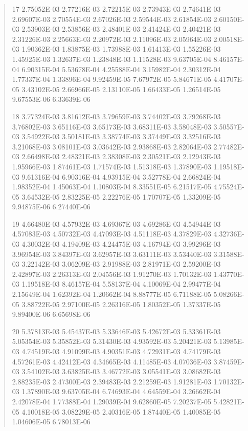 \documentclass[letterpaper,10pt,english]{sphinxmanual}
\begin{document}
\begin{quote}
\begin{DUlineblock}{0em}
\item[] 17   2.75052E-03  2.77216E-03  2.72215E-03  2.73943E-03  2.74641E-03  2.69607E-03  2.70554E-03  2.67026E-03  2.59544E-03  2.61854E-03  2.60150E-03  2.53903E-03  2.53856E-03  2.48401E-03  2.41424E-03  2.40421E-03  2.31226E-03  2.25663E-03  2.20972E-03  2.11096E-03  2.05964E-03  2.00518E-03  1.90362E-03  1.83875E-03  1.73988E-03  1.61413E-03  1.55226E-03  1.45925E-03  1.32637E-03  1.23848E-03  1.11528E-03  9.63705E-04  8.46157E-04  6.90315E-04  5.53678E-04  4.25588E-04  3.15982E-04  2.30312E-04  1.77337E-04  1.33896E-04  9.92459E-05  7.67972E-05  5.84671E-05  4.41707E-05  3.43102E-05  2.66966E-05  2.13110E-05  1.66433E-05  1.26514E-05  9.67553E-06  6.33639E-06
\item[] 18   3.77324E-03  3.81612E-03  3.79659E-03  3.74402E-03  3.79268E-03  3.76802E-03  3.65116E-03  3.65173E-03  3.68311E-03  3.58048E-03  3.50557E-03  3.54922E-03  3.50181E-03  3.38774E-03  3.37449E-03  3.32516E-03  3.21068E-03  3.08101E-03  3.03642E-03  2.93868E-03  2.82064E-03  2.77482E-03  2.66498E-03  2.48321E-03  2.38308E-03  2.30521E-03  2.12943E-03  1.95966E-03  1.87461E-03  1.71574E-03  1.51318E-03  1.37890E-03  1.19518E-03  9.61316E-04  6.90316E-04  4.93915E-04  3.52778E-04  2.66824E-04  1.98352E-04  1.45063E-04  1.10803E-04  8.33551E-05  6.21517E-05  4.75524E-05  3.64532E-05  2.83225E-05  2.22276E-05  1.70707E-05  1.33209E-05  9.94875E-06  6.27440E-06
\item[] 19   4.66480E-03  4.57932E-03  4.69367E-03  4.69286E-03  4.54944E-03  4.57083E-03  4.50732E-03  4.47093E-03  4.51118E-03  4.37829E-03  4.32736E-03  4.30032E-03  4.19409E-03  4.24475E-03  4.16794E-03  3.99296E-03  3.96954E-03  3.84397E-03  3.62957E-03  3.63111E-03  3.53440E-03  3.31588E-03  3.22142E-03  3.06209E-03  2.91988E-03  2.81971E-03  2.59200E-03  2.42897E-03  2.26313E-03  2.04556E-03  1.91270E-03  1.70132E-03  1.43770E-03  1.19518E-03  8.46157E-04  5.58137E-04  4.10069E-04  2.99477E-04  2.15649E-04  1.62392E-04  1.20662E-04  8.88777E-05  6.71188E-05  5.08266E-05  3.88722E-05  2.97100E-05  2.26316E-05  1.80352E-05  1.37337E-05  9.89400E-06  6.65698E-06
\item[] 20   5.37813E-03  5.45437E-03  5.33646E-03  5.42672E-03  5.33361E-03  5.05354E-03  5.35852E-03  5.31430E-03  4.93592E-03  5.20421E-03  5.13985E-03  4.74519E-03  4.91099E-03  4.90351E-03  4.72931E-03  4.74179E-03  4.57261E-03  4.42412E-03  4.34665E-03  4.11485E-03  4.07036E-03  3.87459E-03  3.54102E-03  3.63825E-03  3.46772E-03  3.05541E-03  3.08682E-03  2.88235E-03  2.47300E-03  2.39483E-03  2.21259E-03  1.91281E-03  1.70132E-03  1.37890E-03  9.63705E-04  6.74693E-04  4.64559E-04  3.26662E-04  2.42078E-04  1.77388E-04  1.29039E-04  9.62860E-05  7.20237E-05  5.42821E-05  4.10018E-05  3.08229E-05  2.40316E-05  1.87440E-05  1.40085E-05  1.04606E-05  6.78013E-06

\end{DUlineblock}
\end{quote}
\end{document}
